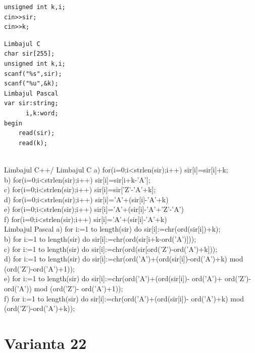 {{\begin{verbatim}
unsigned int k,i;
cin>>sir;
cin>>k;
\end{verbatim}
\begin{verbatim}
Limbajul C
char sir[255];
unsigned int k,i;
scanf("%s",sir);
scanf("%u",&k);
Limbajul Pascal 
var sir:string; 
      i,k:word; 
begin 
    read(sir); 
    read(k);
\end{verbatim}
\\
Limbajul C++/ Limbajul C
a) for(i=0;i<strlen(sir);i++) sir[i]=sir[i]+k; 
\\
b) for(i=0;i<strlen(sir);i++) sir[i]=sir[i+k-'A']; 
\\
c) for(i=0;i<strlen(sir);i++) sir[i]=sir['Z'-'A'+k]; 
\\
d) for(i=0;i<strlen(sir);i++) 
      sir[i]='A'+(sir[i]-'A'+k)%
\\
e) for(i=0;i<strlen(sir);i++) 
    sir[i]='A'+(sir[i]-'A'+'Z'-'A')%
\\
f) for(i=0;i<strlen(sir);i++) 
     sir[i]='A'+(sir[i]-'A'+k)%
\\
Limbajul Pascal
a) for i:=1 to length(sir) do 
   sir[i]:=chr(ord(sir[i])+k); 
\\
b) for i:=1 to length(sir) do 
   sir[i]:=chr(ord(sir[i+k-ord('A')])); 
\\
c) for i:=1 to length(sir) do   
      sir[i]:=chr(ord(sir[ord('Z')-ord('A')+k]));
\\ 
d) for i:=1 to length(sir) do                     
      sir[i]:=chr(ord('A')+(ord(sir[i])-ord('A')+k) mod       
        (ord('Z')-ord('A')+1));
\\
e) for i:=1 to length(sir) do    
   sir[i]:=chr(ord('A')+(ord(sir[i])- ord('A')+   
ord('Z')-ord('A')) mod (ord('Z')- ord('A')+1));        
\\             
f) for i:=1 to length(sir) do                     
     sir[i]:=chr(ord('A')+(ord(sir[i])- ord('A')+k)    
     mod (ord('Z')-ord('A')+k));
\\

\section*{Varianta 22}

}}
